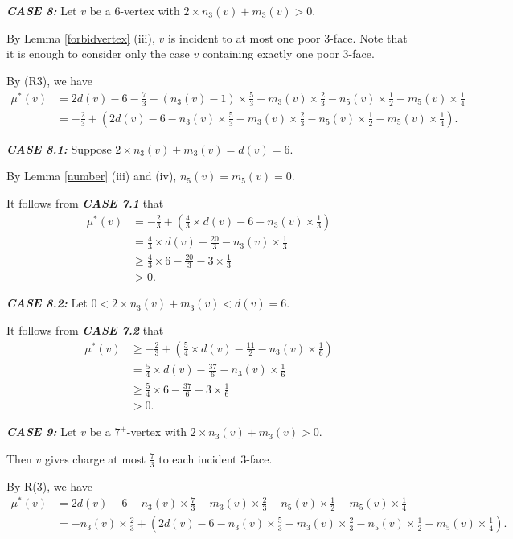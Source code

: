 \documentclass[11pt]{amsart} %
\theoremstyle{definition}
\begin{document}
\noindent\textit{\textbf{CASE 8:}} Let $v$ be a $6$-vertex 
with $2\times n_3(v)+m_3(v)>0$. 

By Lemma \ref{forbidvertex} (iii), 
$v$ is incident to at most one poor $3$-face. 
Note that it is enough to consider only 
the case $v$ containing exactly one poor $3$-face. 

By (R3),  we have   
\begin{align*}
\mu^*(v)&=2d(v)-6-\frac{7}{3}-(n_3(v)-1)\times\frac{5}{3}
-m_3(v)\times\frac{2}{3}-n_5(v)\times\frac{1}{2}
-m_5(v)\times\frac{1}{4}\\
&=-\frac{2}{3}+(2d(v)-6-n_3(v)\times\frac{5}{3}
-m_3(v)\times\frac{2}{3}-n_5(v)\times\frac{1}{2}
-m_5(v)\times\frac{1}{4}).
\end{align*}

\textit{\textbf{CASE 8.1:}} Suppose $2\times n_3(v)+m_3(v)=d(v)=6$. 

By Lemma \ref{number} (iii) and (iv), $n_5(v)=m_5(v)=0.$ 

It follows from \textit{\textbf{CASE 7.1}} that
\begin{align*}
\mu^*(v)&=-\frac{2}{3}+(\frac{4}{3}\times d(v)-6-n_3(v)\times\frac{1}{3})\\
&=\frac{4}{3}\times d(v)-\frac{20}{3}-n_3(v)\times\frac{1}{3}\\
&\geq\frac{4}{3}\times 6-\frac{20}{3}-3\times\frac{1}{3}\\
&>0.
\end{align*}


\textit{\textbf{CASE 8.2:}} Let $0<2\times n_3(v)+m_3(v)<d(v)=6$.

It follows from \textit{\textbf{CASE 7.2}} that
\begin{align*}
\mu^*(v)&\geq-\frac{2}{3}+(\frac{5}{4}\times d(v)
-\frac{11}{2}-n_3(v)\times\frac{1}{6})\\
&=\frac{5}{4}\times d(v)-\frac{37}{6}-n_3(v)\times\frac{1}{6}\\
&\geq\frac{5}{4}\times 6-\frac{37}{6}-3\times\frac{1}{6}\\
&>0.
\end{align*}

\noindent\textit{\textbf{CASE 9:}} Let $v$ be a $7^+$-vertex 
with $2\times n_3(v)+m_3(v)>0$. 

Then $v$ gives charge at most $\frac{7}{3}$ to each incident $3$-face. 

By R(3),  we have 
\begin{align*}
\mu^*(v)&=2d(v)-6-n_3(v)\times\frac{7}{3}-m_3(v)\times\frac{2}{3}
-n_5(v)\times\frac{1}{2}-m_5(v)\times\frac{1}{4}\\
&=-n_3(v)\times\frac{2}{3}+(2d(v)-6-n_3(v)\times\frac{5}{3}
-m_3(v)\times\frac{2}{3}-n_5(v)\times\frac{1}{2}
-m_5(v)\times\frac{1}{4}).
\end{align*}
\end{document}

